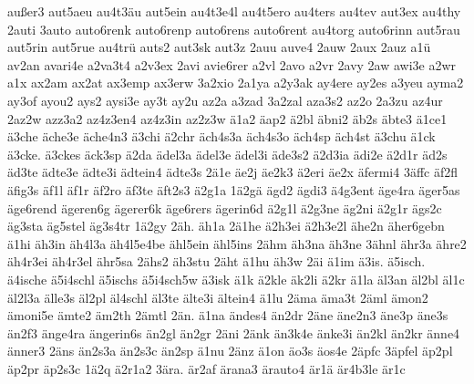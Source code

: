 {    außer3
    aut5aeu
    au4t3äu
    aut5ein
    au4t3e4l
    au4t5ero
    au4ters
    au4tev
    aut3ex
    au4thy
    2auti
    3auto
    auto6renk
    auto6renp
    auto6rens
    auto6rent
    au4torg
    auto6rinn
    aut5rau
    aut5rin
    aut5rue
    au4trü
    auts2
    aut3sk
    aut3z
    2auu
    auve4
    2auw
    2aux
    2auz
    a1ü
    av2an
    avari4e
    a2va3t4
    a2v3ex
    2avi
    avie6rer
    a2vl
    2avo
    a2vr
    2avy
    2aw
    awi3e
    a2wr
    a1x
    ax2am
    ax2at
    ax3emp
    ax3erw
    3a2xio
    2a1ya
    a2y3ak
    ay4ere
    ay2es
    a3yeu
    ayma2
    ay3of
    ayou2
    ays2
    aysi3e
    ay3t
    ay2u
    az2a
    a3zad
    3a2zal
    aza3s2
    az2o
    2a3zu
    az4ur
    2az2w
    azz3a2
    az4z3en4
    az4z3in
    az2z3w
    ä1a2
    äap2
    ä2bl
    äbni2
    äb2s
    äbte3
    ä1ce1
    ä3che
    äche3e
    äche4n3
    ä3chi
    ä2chr
    äch4s3a
    äch4s3o
    äch4sp
    äch4st
    ä3chu
    ä1ck
    ä3cke.
    ä3ckes
    äck3sp
    ä2da
    ädel3a
    ädel3e
    ädel3i
    äde3s2
    ä2d3ia
    ädi2e
    ä2d1r
    äd2s
    äd3te
    ädte3e
    ädte3i
    ädtein4
    ädte3s
    2ä1e
    äe2j
    äe2k3
    ä2eri
    äe2x
    äfermi4
    3äffc
    äf2fl
    äfig3s
    äf1l
    äf1r
    äf2ro
    äf3te
    äft2s3
    ä2g1a
    1ä2gä
    ägd2
    ägdi3
    ä4g3ent
    äge4ra
    äger5as
    äge6rend
    ägeren6g
    ägerer6k
    äge6rers
    ägerin6d
    ä2g1l
    ä2g3ne
    äg2ni
    ä2g1r
    ägs2c
    äg3sta
    äg5stel
    äg3s4tr
    1ä2gy
    2äh.
    äh1a
    2ä1he
    ä2h3ei
    ä2h3e2l
    ähe2n
    äher6gebn
    ä1hi
    äh3in
    äh4l3a
    äh4l5e4be
    ähl5ein
    ähl5ins
    2ähm
    äh3na
    äh3ne
    3ähnl
    ähr3a
    ähre2
    äh4r3ei
    äh4r3el
    ähr5sa
    2ähs2
    äh3stu
    2äht
    ä1hu
    äh3w
    2äi
    ä1im
    ä3is.
    ä5isch.
    ä4ische
    ä5i4schl
    ä5ischs
    ä5i4sch5w
    ä3isk
    ä1k
    ä2kle
    äk2li
    ä2kr
    ä1la
    äl3an
    äl2bl
    äl1c
    äl2l3a
    älle3s
    äl2pl
    äl4schl
    äl3te
    älte3i
    ältein4
    ä1lu
    2äma
    äma3t
    2äml
    ämon2
    ämoni5e
    ämte2
    äm2th
    2ämtl
    2än.
    ä1na
    ändes4
    än2dr
    2äne
    äne2n3
    äne3p
    äne3s
    än2f3
    änge4ra
    ängerin6s
    än2gl
    än2gr
    2äni
    2änk
    än3k4e
    änke3i
    än2kl
    än2kr
    änne4
    änner3
    2äns
    än2s3a
    än2s3c
    än2sp
    ä1nu
    2änz
    ä1on
    äo3s
    äos4e
    2äpfc
    3äpfel
    äp2pl
    äp2pr
    äp2s3c
    1ä2q
    ä2r1a2
    3ära.
    är2af
    ärana3
    ärauto4
    är1ä
    är4b3le
    är1c
}
